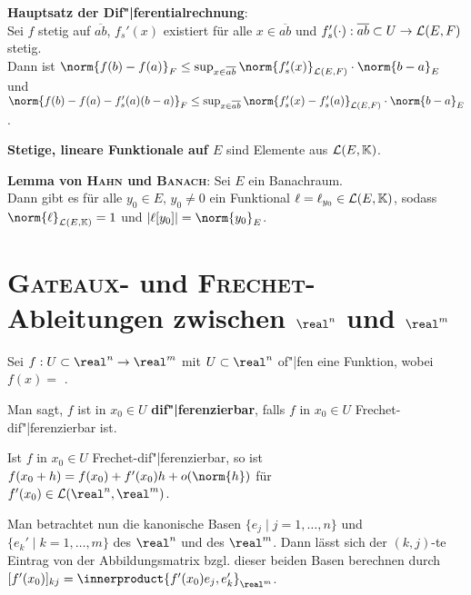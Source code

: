 \textbf{Hauptsatz der Dif"|ferentialrechnung}: \\
Sei $f$ stetig auf $\overline{ab}$,
$f_s'(x)$ existiert für alle $x \in \overline{ab}$ und
$f_s'(\cdot): \overline{ab} \subset U \rightarrow \mathcal{L}(E,F)$ stetig. \\
Dann ist
$\norm{f(b) - f(a)}_F \le \sup_{x \in \overline{ab}}
\norm{f_s'(x)}_{\L(E,F)} \cdot \norm{b - a}_E$ und \\
$\norm{f(b) - f(a) - f_s'(a)(b - a)}_F \le \sup_{x \in \overline{ab}}
\norm{f_s'(x) - f_s'(a)}_{\L(E,F)} \cdot \norm{b - a}_E$.

\linie

\textbf{Stetige, lineare Funktionale auf $E$} sind Elemente aus
$\mathcal{L}(E, \mathbb{K})$.

\textbf{Lemma von \textsc{Hahn} und \textsc{Banach}}:
Sei $E$ ein Banachraum. \\
Dann gibt es für alle $y_0 \in E$, $y_0 \not= 0$
ein Funktional $\ell = \ell_{y_0} \in \mathcal{L}(E, \mathbb{K})$, sodass \\
$\norm{\ell}_{\L(E, \field)} = 1$ und
$|\ell[y_0]| = \norm{y_0}_E$.

\pagebreak

\section{%
    \textsc{Gateaux}- und \textsc{Frechet}-Ableitungen zwischen
    \texorpdfstring{$\real^n$ und $\real^m$}{ℝ\^{}n und ℝ\^{}m}
}

Sei $f: U \subset \real^n \rightarrow \real^m$ mit $U \subset \real^n$ of"|fen
eine Funktion, wobei $f(x) =$
.

Man sagt, $f$ ist in $x_0 \in U$ \textbf{dif"|ferenzierbar},
falls $f$ in $x_0 \in U$ Frechet-dif"|ferenzierbar ist.

\linie

Ist $f$ in $x_0 \in U$ Frechet-dif"|ferenzierbar, so ist
$f(x_0 + h) = f(x_0) + f'(x_0)h + o(\norm{h})$ für \\
$f'(x_0) \in \L(\real^n, \real^m)$.

Man betrachtet nun die kanonische Basen $\{e_j \;|\; j = 1, \dotsc, n\}$ und
$\{e_k' \;|\; k = 1, \dotsc, m\}$ des $\real^n$ und des $\real^m$.
Dann lässt sich der $(k, j)$-te Eintrag von der Abbildungsmatrix bzgl. dieser
beiden Basen berechnen durch
$[f'(x_0)]_{kj} = \innerproduct{f'(x_0)e_j, e_k'}_{\real^m}$.

